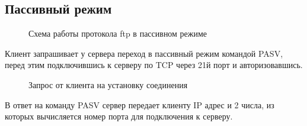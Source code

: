 \documentclass[a4paper, 14pt,russian]{article}
\begin{document}
\subsection{Пассивный режим}
	\begin{figure}[h!]
		\caption{Схема работы протокола ftp в пассивном режиме}
		\label{img:ftp_scheme}
	\end{figure}
	

	Клиент запрашивает у сервера переход в пассивный режим командой PASV, перед этим подключившись к серверу по TCP через 21й порт и авторизовавшись.
	
	\begin{figure}[h!]
		\caption{Запрос от клиента на установку соединения}
		\label{img:ftp_scheme}
	\end{figure}

	\newpage
	В ответ на команду PASV сервер передает клиенту IP адрес и 2 числа, из которых вычисляется номер порта для подключения к серверу.
	
\end{document}
